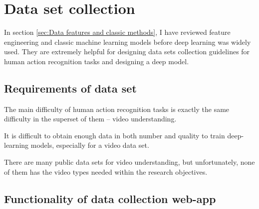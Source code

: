 \section{Data set collection}
\label{sec:Data set collection}
In section \ref{sec:Data features and classic methods}, I have reviewed feature engineering and classic machine learning models before deep learning was widely used.
They are extremely helpful for designing data sets collection guidelines for human action recognition tasks and designing a deep model.

\subsection{Requirements of data set}
The main difficulty of human action recognition tasks is exactly the same difficulty in the superset of them -- video understanding.

It is difficult to obtain enough data in both number and quality to train deep-learning models, especially for a video data set.

There are many public data sets for video understanding, but unfortunately, none of them has the video types needed within the research objectives.

\subsection{Functionality of data collection web-app}
